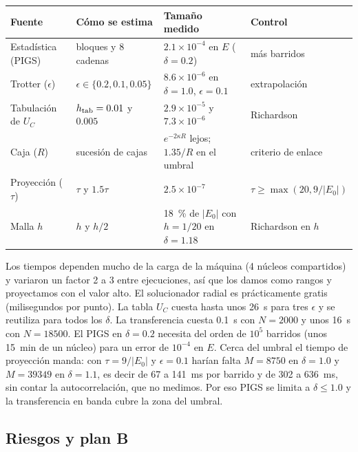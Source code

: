 \documentclass[11pt]{article}
\begin{document}
\begin{table}[H]
\centering
\small
\begin{tabular}{@{}L{2.6cm}L{3.3cm}L{4.6cm}L{3.2cm}@{}}
\toprule
\textbf{Fuente} & \textbf{Cómo se estima} & \textbf{Tamaño medido} & \textbf{Control}\\
\midrule
Estadística (PIGS) & bloques y 8 cadenas & $2.1\times10^{-4}$ en $E$ ($\delta=0.2$) & más barridos\\
Trotter ($\epsilon$) & $\epsilon\in\{0.2,0.1,0.05\}$ & $8.6\times10^{-6}$ en $\delta=1.0$, $\epsilon=0.1$ & extrapolación\\
Tabulación de $U_C$ & $h_{\rm tab}=0.01$ y $0.005$ & $2.9\times10^{-5}$ y $7.3\times10^{-6}$ & Richardson\\
Caja ($R$) & sucesión de cajas & $e^{-2\kappa R}$ lejos; $1.35/R$ en el umbral & criterio de enlace\\
Proyección ($\tau$) & $\tau$ y $1.5\tau$ & $2.5\times10^{-7}$ & $\tau\ge\max(20,9/|E_0|)$\\
Malla $h$ & $h$ y $h/2$ & 18~\% de $|E_0|$ con $h=1/20$ en $\delta=1.18$ & Richardson en $h$\\
\bottomrule
\end{tabular}
\end{table}

Los tiempos dependen mucho de la carga de la máquina (4 núcleos compartidos) y variaron un factor 2 a 3 entre ejecuciones, así que los damos como rangos y proyectamos con el valor alto. El solucionador radial es prácticamente gratis (milisegundos por punto). La tabla $U_C$ cuesta hasta unos 26~s para tres $\epsilon$ y se reutiliza para todos los $\delta$. La transferencia cuesta 0.1~s con $N=2000$ y unos 16~s con $N=18500$. El PIGS en $\delta=0.2$ necesita del orden de $10^5$ barridos (unos 15~min de un núcleo) para un error de $10^{-4}$ en $E$. Cerca del umbral el tiempo de proyección manda: con $\tau=9/|E_0|$ y $\epsilon=0.1$ harían falta $M=8750$ en $\delta=1.0$ y $M=39349$ en $\delta=1.1$, es decir de 67 a 141~ms por barrido y de 302 a 636~ms, sin contar la autocorrelación, que no medimos. Por eso PIGS se limita a $\delta\le1.0$ y la transferencia en banda cubre la zona del umbral.

\subsection{Riesgos y plan B}
\end{document}
